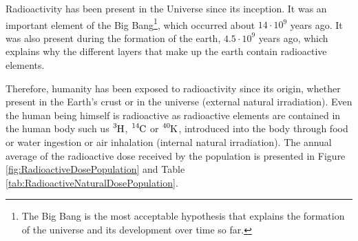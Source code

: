 

Radioactivity has been present in the Universe since its inception. It was an important element of the Big Bang\footnote{The Big Bang is the most acceptable hypothesis that explains the formation of the universe and its development over time so far.}, which occurred about $14 \cdot{} 10^9$ years ago. It was also present during the formation of the earth, $4.5 \cdot{} 10^9$ years ago, which explains why the different layers that make up the earth contain radioactive elements. 


Therefore, humanity has been exposed to radioactivity since its origin, whether present in the Earth's crust or in the universe (external natural irradiation). Even the human being himself is radioactive as radioactive elements are contained in the human body such us $\ce{^{3}H}$, $\ce{^{14}C}$ or $\ce{^{40}K}$, introduced into the body through food or water ingestion or air inhalation (internal natural irradiation). The annual average of the radioactive dose received by the population is presented in Figure \ref{fig:RadioactiveDosePopulation} and Table \ref{tab:RadioactiveNaturalDosePopulation}.

